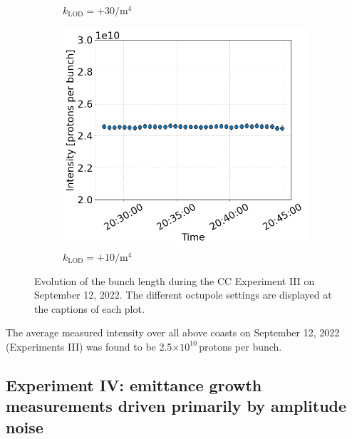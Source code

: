 \begin{figure}[htp]
\begin{subfigure}{.45\textwidth}
            \caption{$k_\mathrm{LOD}=+30 \mathrm{/m^{4}}$}
    \end{subfigure}
    \begin{subfigure}{.45\textwidth}
        \centering
        \includegraphics[width=.95\linewidth]{images/app_e/intensity_cc_md_12Sep22_coast_11.png}  
        \caption{$k_\mathrm{LOD}=+10  \mathrm{/m^{4}}$}
\end{subfigure}
    \caption{Evolution of the bunch length during the CC Experiment III on September 12, 2022. The different octupole settings are displayed at the captions of each plot.}
    \label{fig:cc_md_sep_2022_overview_plots_klod_scan_intensity}
 \end{figure}

 The average measured intensity over all above coasts on September 12, 2022 (Experiments III) was found to be 2.5$\times 10^{10}$\,protons per bunch. 



\subsection{Experiment IV: emittance growth measurements driven primarily by amplitude noise}\label{subsec:2022_exp4_intensity}

